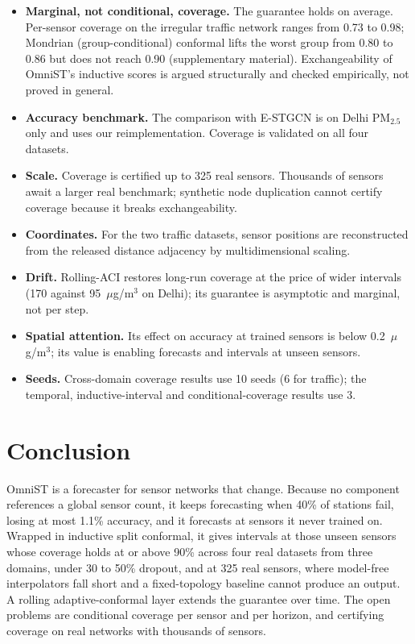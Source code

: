 \documentclass[journal,twoside,web]{ieeecolor}
\begin{document}
\begin{itemize}
\item \textbf{Marginal, not conditional, coverage.} The guarantee holds on average. Per-sensor
coverage on the irregular traffic network ranges from 0.73 to 0.98; Mondrian (group-conditional)
conformal lifts the worst group from 0.80 to 0.86 but does not reach 0.90 (supplementary material).
Exchangeability of OmniST's inductive scores is argued structurally and checked empirically, not
proved in general.
\item \textbf{Accuracy benchmark.} The comparison with E-STGCN is on Delhi PM$_{2.5}$ only and uses
our reimplementation. Coverage is validated on all four datasets.
\item \textbf{Scale.} Coverage is certified up to 325 real sensors. Thousands of sensors await a larger
real benchmark; synthetic node duplication cannot certify coverage because it breaks exchangeability.
\item \textbf{Coordinates.} For the two traffic datasets, sensor positions are reconstructed from the
released distance adjacency by multidimensional scaling.
\item \textbf{Drift.} Rolling-ACI restores long-run coverage at the price of wider intervals (170
against 95~$\mu$g/m$^3$ on Delhi); its guarantee is asymptotic and marginal, not per step.
\item \textbf{Spatial attention.} Its effect on accuracy at trained sensors is below
0.2~$\mu$g/m$^3$; its value is enabling forecasts and intervals at unseen sensors.
\item \textbf{Seeds.} Cross-domain coverage results use 10 seeds (6 for traffic); the temporal,
inductive-interval and conditional-coverage results use 3.
\end{itemize}

\section{Conclusion}
\label{sec:conclusion}

OmniST is a forecaster for sensor networks that change. Because no component references a global
sensor count, it keeps forecasting when 40\% of stations fail, losing at most 1.1\% accuracy, and it
forecasts at sensors it never trained on. Wrapped in inductive split conformal, it gives intervals at
those unseen sensors whose coverage holds at or above 90\% across four real datasets from three
domains, under 30 to 50\% dropout, and at 325 real sensors, where model-free interpolators fall short
and a fixed-topology baseline cannot produce an output. A rolling adaptive-conformal layer extends the
guarantee over time. The open problems are conditional coverage per sensor and per horizon, and
certifying coverage on real networks with thousands of sensors.
\end{document}
